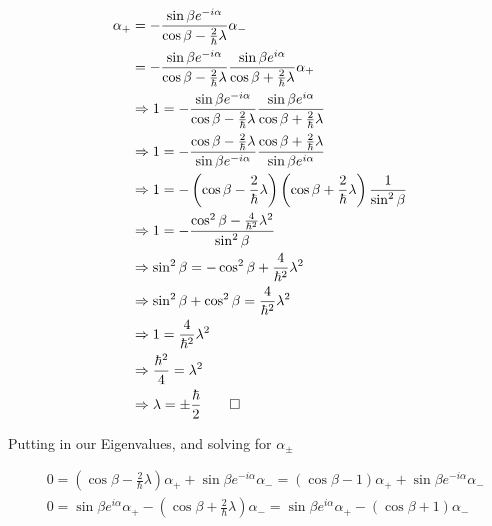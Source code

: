 \begin{answer}
  \begin{equation}
    \begin{split}
      \alpha_+ &= - \frac{\sin{\beta}e^{-i\alpha}}{\cos{\beta}-\frac{2}{\hbar}\lambda}\alpha_-\\
      &= - \frac{\sin{\beta}e^{-i\alpha}}{\cos{\beta}-\frac{2}{\hbar}\lambda}\frac{\sin{\beta}e^{i\alpha}}{\cos{\beta} + \frac{2}{\hbar}\lambda}\alpha_+\\
      &\Rightarrow
      1 = - \frac{\sin{\beta}e^{-i\alpha}}{\cos{\beta}-\frac{2}{\hbar}\lambda}\frac{\sin{\beta}e^{i\alpha}}{\cos{\beta} + \frac{2}{\hbar}\lambda}\\
      &\Rightarrow
      1 = - \frac{\cos{\beta}-\frac{2}{\hbar}\lambda}{\sin{\beta}e^{-i\alpha}}\frac{\cos{\beta} + \frac{2}{\hbar}\lambda}{\sin{\beta}e^{i\alpha}}\\
      &\Rightarrow
      1 = - \left(\cos{\beta}-\frac{2}{\hbar}\lambda\right)\left(\cos{\beta} + \frac{2}{\hbar}\lambda\right) \frac{1}{\sin^2{\beta}}\\
      &\Rightarrow
      1 = - \frac{\cos^2{\beta} - \frac{4}{\hbar^2}\lambda^2}{\sin^2{\beta}}\\
      &\Rightarrow
      \sin^2{\beta} = - \cos^2{\beta} + \frac{4}{\hbar^2}\lambda^2\\
      &\Rightarrow
      \sin^2{\beta} + \cos^2{\beta} = \frac{4}{\hbar^2}\lambda^2\\
      &\Rightarrow
      1 = \frac{4}{\hbar^2}\lambda^2\\
      &\Rightarrow
      \frac{\hbar^2}{4} = \lambda^2\\
      &\Rightarrow
      \lambda = \pm \frac{\hbar}{2}\qed\\
    \end{split}
  \end{equation}

Putting in our Eigenvalues, and solving for $\alpha_\pm$
  
  \begin{equation}
    \begin{split}
      &0 = (\cos{\beta}-\frac{2}{\hbar}\lambda)\alpha_+ + \sin{\beta}e^{-i\alpha}\alpha_-
      = (\cos{\beta}-1)\alpha_+ + \sin{\beta}e^{-i\alpha}\alpha_-\\
      &0 = \sin{\beta}e^{i\alpha}\alpha_+ - (\cos{\beta} + \frac{2}{\hbar}\lambda)\alpha_-
      = \sin{\beta}e^{i\alpha}\alpha_+ - (\cos{\beta} + 1)\alpha_-\\
    \end{split}
  \end{equation}


\end{answer}
